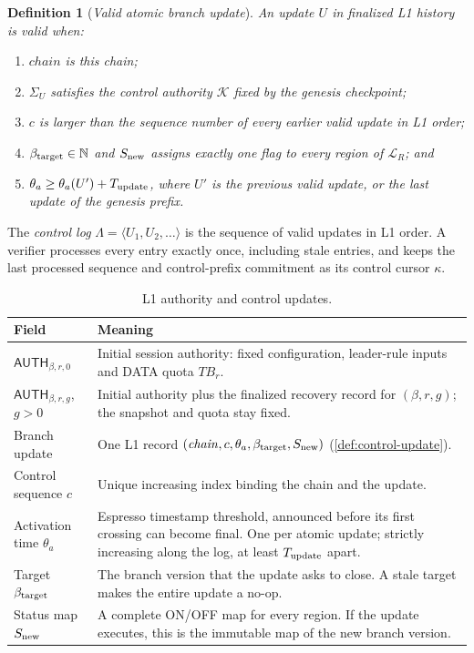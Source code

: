 \documentclass[11pt,a4paper]{article}
\newcommand{\TB}{\mathit{TB}}
\newcommand{\tagg}[1]{\ensuremath{\mathsf{#1}}}
\newcommand{\defterm}[1]{\textcolor{rrBlue}{\textit{#1}}}
\newtheorem{definition}{Definition}[section]
\begin{document}
\begin{definition}[\defterm{Valid atomic branch update}]
\label{def:control-valid}
An update $U$ in finalized L1 history is valid when:
\begin{enumerate}[label=(V\arabic*)]
\item $\mathit{chain}$ is this chain;
\item $\Sigma_U$ satisfies the control authority $\mathcal K$ fixed by
the genesis checkpoint;
\item $c$ is larger than the sequence number of every earlier valid
update in L1 order;
\item $\beta_{\rm target}\in\mathbb N$ and $S_{\rm new}$ assigns exactly
one flag to every region of $\mathcal L_R$; and
\item $\theta_a\ge\theta_a(U')+T_{\rm update}$, where $U'$ is the
previous valid update, or the last update of the genesis prefix.
\end{enumerate}
\end{definition}

The \defterm{control log} $\Lambda=\langle U_1,U_2,\ldots\rangle$ is the
sequence of valid updates in L1 order. A verifier processes every entry
exactly once, including stale entries, and keeps the last processed
sequence and control-prefix commitment as its control cursor $\kappa$.

\begin{table}[htbp]\centering\small
\caption{L1 authority and control updates.}\label{tab:l1}
\begin{tabularx}{\linewidth}{@{}p{.27\linewidth}Y@{}}\toprule
Field & Meaning\\\midrule
$\tagg{AUTH}_{\beta,r,0}$ & Initial session authority: fixed configuration,
leader-rule inputs and DATA quota $\TB_r$.\\
$\tagg{AUTH}_{\beta,r,g}$, $g>0$ & Initial authority plus the finalized
recovery record for $(\beta,r,g)$; the snapshot and quota stay fixed.\\
Branch update & One L1 record
$(\mathit{chain},c,\theta_a,\beta_{\rm target},S_{\rm new})$
(\cref{def:control-update}).\\
Control sequence $c$ & Unique increasing index binding the chain and the
update.\\
Activation time $\theta_a$ & Espresso timestamp threshold, announced
before its first crossing can become final. One per atomic update;
strictly increasing along the log, at least
$T_{\rm update}$ apart.\\
Target $\beta_{\rm target}$ & The branch version that the update asks to
close. A stale target makes the entire update a no-op.\\
Status map $S_{\rm new}$ & A complete ON/OFF map for every region. If
the update executes, this is the immutable map of the new branch
version.\\\bottomrule
\end{tabularx}
\end{table}
\end{document}
